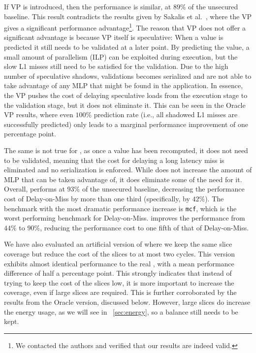 If VP is introduced, then the performance is similar, at $89\%$ of the unsecured baseline.
This result contradicts the results given by Sakalis et al.~\cite{sakalis+:ISCA2019vp}, where the VP gives a significant performance advantage\footnote{We contacted the authors and verified that our results are indeed valid.}. %
The reason that VP does not offer a significant advantage is because VP itself is speculative: When a value is predicted it still needs to be validated at a later point. 
By predicting the value, a small amount of parallelism (ILP) can be exploited during execution, but the slow L1 misses still need to be satisfied for the validation. 
Due to the high number of speculative shadows, validations becomes serialized and are not able to take advantage of any MLP that might be found in the application. 
In essence, the VP pushes the cost of delaying speculative loads from the execution stage to the validation stage, but it does not eliminate it. 
This can be seen in the Oracle VP results, where even $100\%$ prediction rate (i.e., all shadowed L1 misses are successfully predicted) only leads to a marginal performance improvement of one percentage point.

The same is not true for \recomp, as once a value has been recomputed, it does not need to be validated, meaning that the cost for delaying a long latency miss is eliminated and no  serialization is enforced.
While \recomp{} does not increase the amount of MLP that can be taken advantage of, it does eliminate some of the need for it.
Overall, \recomp{} performs at $93\%$ of the unsecured baseline, decreasing the performance cost of Delay-on-Miss by more than one third (specifically, by $42\%$).
The benchmark with the most dramatic performance increase is \texttt{mcf}, which is the worst performing benchmark for Delay-on-Miss. 
\recomp{} improves the performance from $44\%$ to $90\%$, reducing the performance cost to one fifth of that of Delay-on-Miss. 

We have also evaluated an artificial version of \recomp{} where we keep the same slice coverage but reduce the cost of the slices to at most two cycles. This version exhibits almost identical performance to the real \recomp{}, with a mean performance difference of half a percentage point. This strongly indicates that instead of trying to keep the cost of the slices low, it is more important to increase the coverage, even if large slices are required. This is further corroborated by the results from the Oracle version, discussed below. However, large slices do increase the energy usage, as we will see in ~\autoref{sec:energy}, so a balance still needs to be kept.

